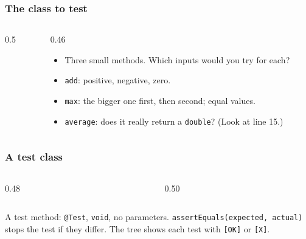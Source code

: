 \documentclass[aspectratio=169,10pt,compress]{beamer}
\begin{document}




\begin{frame}[t,fragile] \frametitle{The class to test}
  \begin{columns}[T]
    \begin{column}{0.5\textwidth}
    \end{column}
    \begin{column}{0.46\textwidth}
      \begin{itemize}\small
        \item Three small methods. Which inputs would you try for each?
        \item \texttt{add}: positive, negative, zero.
        \item \texttt{max}: the bigger one first, then second; equal values.
        \item \texttt{average}: does it really return a \texttt{double}? (Look at line 15.)
      \end{itemize}
    \end{column}
  \end{columns}
\end{frame}




\begin{frame}[t,fragile] \frametitle{A test class}
  \begin{columns}[T]
    \begin{column}{0.48\textwidth}
    \end{column}
    \begin{column}{0.50\textwidth}
    \end{column}
  \end{columns}

  \vspace{0.2em}
  \small A test method: \texttt{@Test}, \texttt{void}, no parameters. \texttt{assertEquals(expected, actual)} stops the test
  if they differ. The tree shows each test with \texttt{[OK]} or \texttt{[X]}.
\end{frame}
\end{document}
